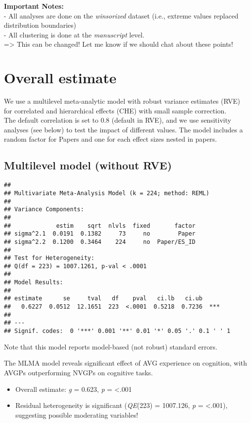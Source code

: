 \documentclass[
]{book}
\begin{document}
\textbf{Important Notes:}\\
- All analyses are done on the \emph{winsorized} dataset (i.e., extreme values replaced distribution boundaries)\\
- All clustering is done at the \emph{manuscript} level.\\
=\textgreater{} This can be changed! Let me know if we should chat about these points!

\hypertarget{overall-estimate}{%
\section{Overall estimate}\label{overall-estimate}}

We use a multilevel meta-analytic model with robust variance estimates (RVE)
for correlated and hierarchical effects (CHE) with small sample correction.\\
The default correlation is set to 0.8 (default in RVE), and we use
sensitivity analyses (see below) to test the impact of different values.
The model includes a random factor for Papers and one for each effect sizes nested
in papers.

\hypertarget{multilevel-model-without-rve}{%
\subsection{Multilevel model (without RVE)}\label{multilevel-model-without-rve}}

\begin{verbatim}
## 
## Multivariate Meta-Analysis Model (k = 224; method: REML)
## 
## Variance Components:
## 
##             estim    sqrt  nlvls  fixed       factor 
## sigma^2.1  0.0191  0.1382     73     no        Paper 
## sigma^2.2  0.1200  0.3464    224     no  Paper/ES_ID 
## 
## Test for Heterogeneity:
## Q(df = 223) = 1007.1261, p-val < .0001
## 
## Model Results:
## 
## estimate      se     tval   df    pval   ci.lb   ci.ub 
##   0.6227  0.0512  12.1651  223  <.0001  0.5218  0.7236  *** 
## 
## ---
## Signif. codes:  0 '***' 0.001 '**' 0.01 '*' 0.05 '.' 0.1 ' ' 1
\end{verbatim}

Note that this model reports model-based (not robust) standard errors.

The MLMA model reveals significant effect of AVG experience on cognition, with
AVGPs outperforming NVGPs on cognitive tasks.

\begin{itemize}
\item
  Overall estimate: \emph{g} = 0.623, \emph{p} = \textless.001
\item
  Residual heterogeneity is significant (\emph{QE}(223) = 1007.126,
  \emph{p} = \textless.001), suggesting possible moderating variables!
\end{itemize}
\end{document}
